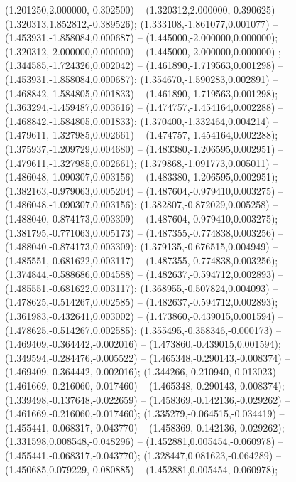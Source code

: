  (1.201250,2.000000,-0.302500) -- (1.320312,2.000000,-0.390625) -- (1.320313,1.852812,-0.389526);
 (1.333108,-1.861077,0.001077) -- (1.453931,-1.858084,0.000687) -- (1.445000,-2.000000,0.000000);
 (1.320312,-2.000000,0.000000) -- (1.445000,-2.000000,0.000000) ;
 (1.344585,-1.724326,0.002042) -- (1.461890,-1.719563,0.001298) -- (1.453931,-1.858084,0.000687);
 (1.354670,-1.590283,0.002891) -- (1.468842,-1.584805,0.001833) -- (1.461890,-1.719563,0.001298);
 (1.363294,-1.459487,0.003616) -- (1.474757,-1.454164,0.002288) -- (1.468842,-1.584805,0.001833);
 (1.370400,-1.332464,0.004214) -- (1.479611,-1.327985,0.002661) -- (1.474757,-1.454164,0.002288);
 (1.375937,-1.209729,0.004680) -- (1.483380,-1.206595,0.002951) -- (1.479611,-1.327985,0.002661);
 (1.379868,-1.091773,0.005011) -- (1.486048,-1.090307,0.003156) -- (1.483380,-1.206595,0.002951);
 (1.382163,-0.979063,0.005204) -- (1.487604,-0.979410,0.003275) -- (1.486048,-1.090307,0.003156);
 (1.382807,-0.872029,0.005258) -- (1.488040,-0.874173,0.003309) -- (1.487604,-0.979410,0.003275);
 (1.381795,-0.771063,0.005173) -- (1.487355,-0.774838,0.003256) -- (1.488040,-0.874173,0.003309);
 (1.379135,-0.676515,0.004949) -- (1.485551,-0.681622,0.003117) -- (1.487355,-0.774838,0.003256);
 (1.374844,-0.588686,0.004588) -- (1.482637,-0.594712,0.002893) -- (1.485551,-0.681622,0.003117);
 (1.368955,-0.507824,0.004093) -- (1.478625,-0.514267,0.002585) -- (1.482637,-0.594712,0.002893);
 (1.361983,-0.432641,0.003002) -- (1.473860,-0.439015,0.001594) -- (1.478625,-0.514267,0.002585);
 (1.355495,-0.358346,-0.000173) -- (1.469409,-0.364442,-0.002016) -- (1.473860,-0.439015,0.001594);
 (1.349594,-0.284476,-0.005522) -- (1.465348,-0.290143,-0.008374) -- (1.469409,-0.364442,-0.002016);
 (1.344266,-0.210940,-0.013023) -- (1.461669,-0.216060,-0.017460) -- (1.465348,-0.290143,-0.008374);
 (1.339498,-0.137648,-0.022659) -- (1.458369,-0.142136,-0.029262) -- (1.461669,-0.216060,-0.017460);
 (1.335279,-0.064515,-0.034419) -- (1.455441,-0.068317,-0.043770) -- (1.458369,-0.142136,-0.029262);
 (1.331598,0.008548,-0.048296) -- (1.452881,0.005454,-0.060978) -- (1.455441,-0.068317,-0.043770);
 (1.328447,0.081623,-0.064289) -- (1.450685,0.079229,-0.080885) -- (1.452881,0.005454,-0.060978);

